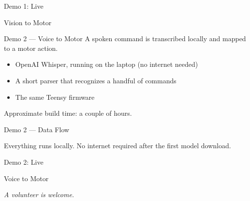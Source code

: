 \documentclass[aspectratio=169,11pt]{beamer}
\begin{document}
\begin{frame}{Demo 1: Live}
  \vfill
  \begin{center}
    \Large Vision to Motor
  \end{center}
  \vfill
\end{frame}

\begin{frame}{Demo 2 --- Voice to Motor}
  A spoken command is transcribed locally and mapped to a motor action.
  \vfill
  \begin{itemize}
    \setlength\itemsep{0.3em}
    \item OpenAI Whisper, running on the laptop (no internet needed)
    \item A short parser that recognizes a handful of commands
    \item The same Teensy firmware
  \end{itemize}
  \vfill
  Approximate build time: a couple of hours.
\end{frame}

\begin{frame}{Demo 2 --- Data Flow}
  \centering
  \vspace{0.5em}
  \vfill
  \small Everything runs locally. No internet required after the first model download.
\end{frame}

\begin{frame}{Demo 2: Live}
  \vfill
  \begin{center}
    \Large Voice to Motor
    \vspace{0.8em}

    \normalsize\itshape A volunteer is welcome.
  \end{center}
  \vfill
\end{frame}
\end{document}
